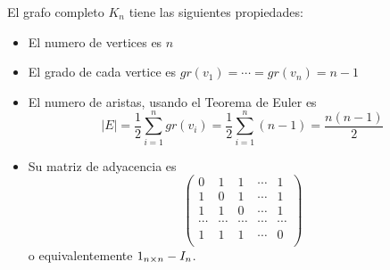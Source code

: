 \begin{proposition}
	El grafo completo \(K_n \) tiene las siguientes propiedades:
	\begin{itemize}
		\item El numero de vertices es \(n \)
		\item El grado de cada vertice es \(gr(v_1) = \cdots = gr(v_n) = n - 1\)
		\item El numero de aristas, usando el Teorema de Euler es
		      \[
			      |E| = \frac{1}{2} \sum_{i=1}^{n } gr(v_i ) = \frac{1}{2} \sum_{i=1}^{n } (n-1) = \frac{n(n-1)}{2}
		      \]
		\item Su matriz de adyacencia es
		      \[
			      \begin{pmatrix}
				      0      & 1      & 1      & \cdots & 1      \\
				      1      & 0      & 1      & \cdots & 1      \\
				      1      & 1      & 0      & \cdots & 1      \\
				      \cdots & \cdots & \cdots & \cdots & \cdots \\
				      1      & 1      & 1      & \cdots & 0      \\
			      \end{pmatrix}
		      \]
		      o equivalentemente \({\large{1}_{n \times n}} - I_n\).
	\end{itemize}
\end{proposition}

